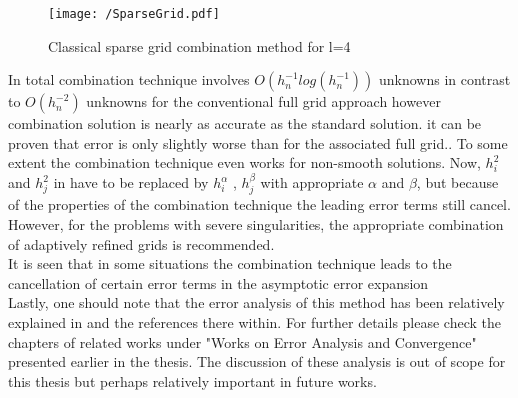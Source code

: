 		\begin{figure}
			\centering
			\texttt{[image: /SparseGrid.pdf]}
			\caption{Classical sparse grid combination method for l=4}
			\label{fig:Sparsegrid}
		\end{figure}
		
In total combination technique involves $O({h}^{-1}_nlog({h}^{-1}_n))$  unknowns in contrast to $O({h}^{-2}_n) $ unknowns for the conventional full grid approach however combination solution is nearly as accurate as the standard solution. it can be proven that error is only slightly worse than for the associated full grid.\cite{Griebel1992a, Griebel1992b}. To some extent the combination technique even works for non-smooth solutions. Now, ${h}^2_i$ and ${h}^2_j$ in have to be replaced by ${h}^\alpha_i$ , ${h}^\beta_j$ with appropriate $\alpha$ and $\beta$, but because of the properties of the combination technique the leading error terms still cancel. However, for the problems with severe singularities, the appropriate combination of adaptively refined grids is recommended.\cite{Griebel1992a}\\ It is seen that in some situations the combination technique leads to the cancellation of certain error terms in the asymptotic error expansion\cite{Griebel1992b} \\
 Lastly, one should note that the error analysis of this method has been relatively explained in \cite{Garcke2013} and the references there within. For further details please check the chapters of related works under "Works on Error Analysis and Convergence" presented earlier in the thesis. The discussion of these analysis is out of scope for this thesis but perhaps relatively important in future works.
%
%
